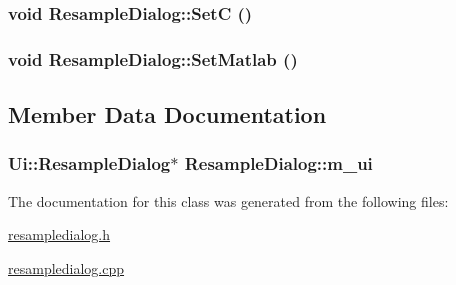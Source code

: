\hypertarget{class_resample_dialog_053a45a8f7d332572185b155185a6c60}{
\subsubsection[{SetC}]{\setlength{\rightskip}{0pt plus 5cm}void ResampleDialog::SetC ()}}
\label{class_resample_dialog_053a45a8f7d332572185b155185a6c60}


\hypertarget{class_resample_dialog_6d2ca68cedde02add245d148ba1a400c}{
\subsubsection[{SetMatlab}]{\setlength{\rightskip}{0pt plus 5cm}void ResampleDialog::SetMatlab ()}}
\label{class_resample_dialog_6d2ca68cedde02add245d148ba1a400c}




\subsection{Member Data Documentation}
\hypertarget{class_resample_dialog_c28f426397a6f6a7961dfced930a56cb}{
\subsubsection[{m\_\-ui}]{\setlength{\rightskip}{0pt plus 5cm}Ui::ResampleDialog$\ast$ {\bf ResampleDialog::m\_\-ui}}}
\label{class_resample_dialog_c28f426397a6f6a7961dfced930a56cb}




The documentation for this class was generated from the following files:\begin{CompactItemize}
\item 
\hyperlink{resampledialog_8h}{resampledialog.h}\item 
\hyperlink{resampledialog_8cpp}{resampledialog.cpp}\end{CompactItemize}

